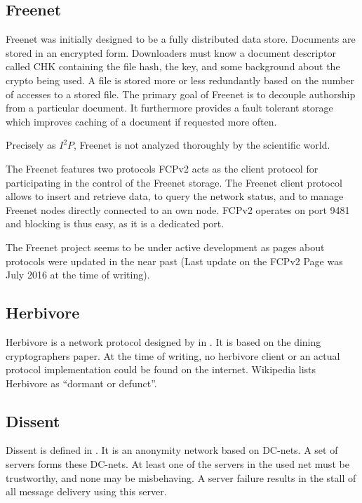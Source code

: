 \subsection{Freenet}
Freenet was initially designed to be a fully distributed data store\cite{freenet}. Documents are stored in an encrypted form. Downloaders must know a document descriptor called CHK containing the file hash, the key, and some background about the crypto being used. A file is stored more or less redundantly based on the number of accesses to a stored file. The primary goal of Freenet is to decouple authorship from a particular document. It furthermore provides a fault tolerant storage which improves caching of a document if requested more often.

Precisely as $I^2P$, Freenet is not analyzed thoroughly by the scientific world. 

The Freenet features two protocols FCPv2 acts as the client protocol for participating in the control of the Freenet storage. The Freenet client protocol allows to insert and retrieve data, to query the network status, and to manage Freenet nodes directly connected to an own node. FCPv2 operates on port 9481 and blocking is thus easy, as it is a dedicated port. 

The Freenet project seems to be under active development as pages about protocols were updated in the near past (Last update on the FCPv2 Page was July  2016 at the time of writing).

\subsection{Herbivore}
Herbivore is a network protocol designed by \citeauthor{herbivore:tr} in \cite{herbivore:tr}. It is based on the dining cryptographers paper\cite{chaum-dc}. At the time of writing, no herbivore client or an actual protocol implementation could be found on the internet. Wikipedia lists Herbivore as ``dormant or defunct''.

\subsection{Dissent}
Dissent is defined in \cite{Corrigan-Gibbs:2010:DAA:1866307.1866346}. It is an anonymity network based on DC-nets. A set of servers forms these DC-nets. At least one of the servers in the used net must be trustworthy, and none may be misbehaving. A server failure results in the stall of all message delivery using this server.

